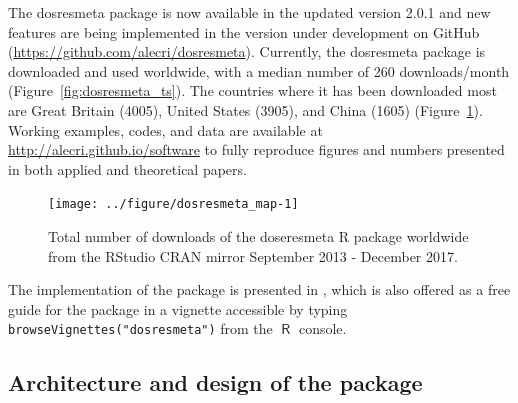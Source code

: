 \documentclass[11pt,a4paper,twoside,openany]{book}\usepackage{knitr}
\newcommand{\pkg}[1]{{\fontseries{b}\selectfont #1}}
\DeclareMathOperator{\R}{\textsf{R}}
\begin{document}
{{\begin{knitrout}
\end{knitrout}

\noindent The \pkg{dosresmeta} package is now available in the updated version 2.0.1 and new features are being implemented in the version under development on GitHub (\url{https://github.com/alecri/dosresmeta}). Currently, the \pkg{dosresmeta} package is downloaded and used worldwide, with a median number of 260 downloads/month (Figure~\ref{fig:dosresmeta_ts}). The countries where it has been downloaded most are Great Britain (4005), United States (3905), and China (1605) (Figure~\ref{fig:dosresmeta_map}). Working examples, codes, and data are available at \url{http://alecri.github.io/software} to fully reproduce figures and numbers presented in both applied and theoretical papers.

\begin{knitrout}\footnotesize
{}\color{fgcolor}\begin{figure}[ht!]

{\centering \texttt{[image: ../figure/dosresmeta\_map-1]} 

}

\caption[Total number of downloads of the doseresmeta R package worldwide from the RStudio CRAN mirror September 2013 - December 2017]{Total number of downloads of the doseresmeta R package worldwide from the RStudio CRAN mirror September 2013 - December 2017.}\label{fig:dosresmeta_map}
\end{figure}


\end{knitrout}

\noindent The implementation of the package is presented in , which is also offered as a free guide for the package in a vignette accessible by typing \texttt{browseVignettes("dosresmeta")} from the $\R$ console.

\subsection{Architecture and design of the package}

}}
\end{document}
